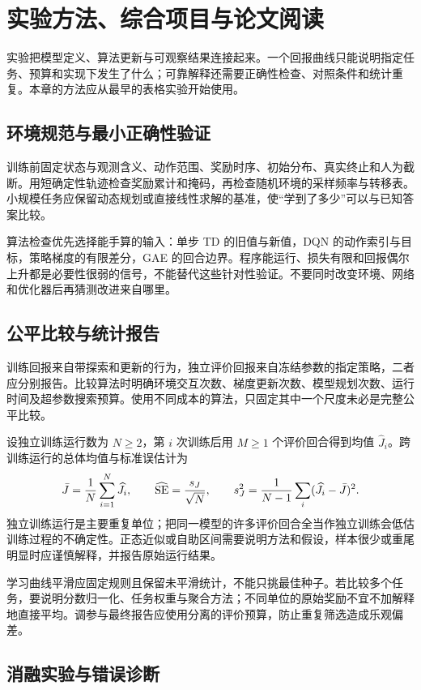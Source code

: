 \documentclass[UTF8,12pt,a4paper,fontset=fandol]{ctexbook}
\begin{document}
\chapter{实验方法、综合项目与论文阅读}
\label{ch:rl-experiments}

实验把模型定义、算法更新与可观察结果连接起来。一个回报曲线只能说明指定任务、预算和实现下发生了什么；可靠解释还需要正确性检查、对照条件和统计重复。本章的方法应从最早的表格实验开始使用。

\section{环境规范与最小正确性验证}

训练前固定状态与观测含义、动作范围、奖励时序、初始分布、真实终止和人为截断。用短确定性轨迹检查奖励累计和掩码，再检查随机环境的采样频率与转移表。小规模任务应保留动态规划或直接线性求解的基准，使“学到了多少”可以与已知答案比较。

算法检查优先选择能手算的输入：单步 TD 的旧值与新值，DQN 的动作索引与目标，策略梯度的有限差分，GAE 的回合边界。程序能运行、损失有限和回报偶尔上升都是必要性很弱的信号，不能替代这些针对性验证。不要同时改变环境、网络和优化器后再猜测改进来自哪里。

\section{公平比较与统计报告}

训练回报来自带探索和更新的行为，独立评价回报来自冻结参数的指定策略，二者应分别报告。比较算法时明确环境交互次数、梯度更新次数、模型规划次数、运行时间及超参数搜索预算。使用不同成本的算法，只固定其中一个尺度未必是完整公平比较。

设独立训练运行数为 $N\geq2$，第 $i$ 次训练后用 $M\geq1$ 个评价回合得到均值 $\widehat J_i$。跨训练运行的总体均值与标准误估计为
\[
\bar J=\frac1N\sum_{i=1}^N\widehat J_i,\qquad
\widehat{\rm SE}=\frac{s_J}{\sqrt N},\qquad
s_J^2=\frac1{N-1}\sum_i(\widehat J_i-\bar J)^2.
\]
独立训练运行是主要重复单位；把同一模型的许多评价回合全当作独立训练会低估训练过程的不确定性。正态近似或自助区间需要说明方法和假设，样本很少或重尾明显时应谨慎解释，并报告原始运行结果。

学习曲线平滑应固定规则且保留未平滑统计，不能只挑最佳种子。若比较多个任务，要说明分数归一化、任务权重与聚合方法；不同单位的原始奖励不宜不加解释地直接平均。调参与最终报告应使用分离的评价预算，防止重复筛选造成乐观偏差。

\section{消融实验与错误诊断}
\end{document}
